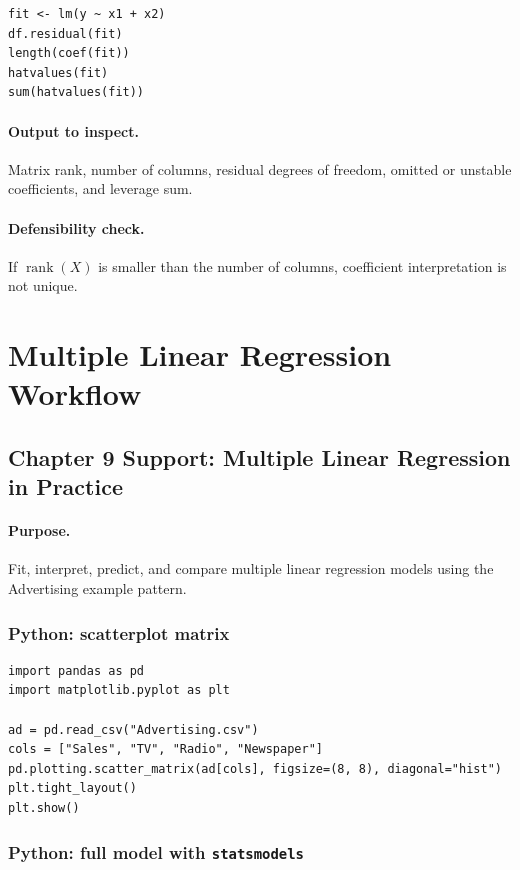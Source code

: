 \begin{verbatim}
fit <- lm(y ~ x1 + x2)
df.residual(fit)
length(coef(fit))
hatvalues(fit)
sum(hatvalues(fit))
\end{verbatim}

\paragraph{Output to inspect.} Matrix rank, number of columns, residual degrees of freedom, omitted or unstable coefficients, and leverage sum.

\paragraph{Defensibility check.} If \(\operatorname{rank}(X)\) is smaller than the number of columns, coefficient interpretation is not unique.

\section{Multiple Linear Regression Workflow}
\label{app:cookbook-multiple-linear-regression}

\subsection{Chapter 9 Support: Multiple Linear Regression in Practice}
\label{app:ch09-software-cookbook-multiple-linear-regression-in-practice}

\paragraph{Purpose.} Fit, interpret, predict, and compare multiple linear regression models using the Advertising example pattern.

\subsubsection*{Python: scatterplot matrix}

\begin{verbatim}
import pandas as pd
import matplotlib.pyplot as plt

ad = pd.read_csv("Advertising.csv")
cols = ["Sales", "TV", "Radio", "Newspaper"]
pd.plotting.scatter_matrix(ad[cols], figsize=(8, 8), diagonal="hist")
plt.tight_layout()
plt.show()
\end{verbatim}

\subsubsection*{Python: full model with \texttt{statsmodels}}


